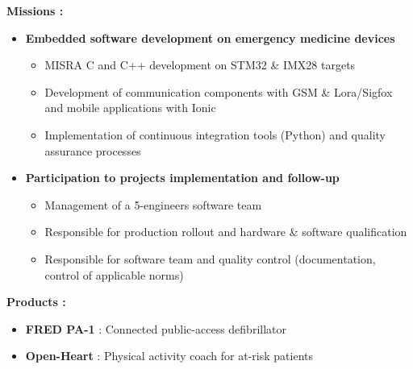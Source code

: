 {	%
\else
	\textcolor{color1}{\textbf{Missions :}}
	\begin{itemize}[leftmargin=\ListItemsMargins]
		\item \textbf{Embedded software development on emergency medicine devices}
		\begin{itemize}
			\item MISRA C and C++ development on STM32 \& IMX28 targets
			\item Development of communication components with GSM \& Lora/Sigfox and mobile applications with Ionic
			\item Implementation of continuous integration tools (Python) and quality assurance processes
		\end{itemize}
		\item \textbf{Participation to projects implementation and follow-up}
		\begin{itemize}
			\ifaddmngt \item Management of a 5-engineers software team \fi
			\item Responsible for production rollout and hardware \& software qualification
			\item Responsible for software team and quality control (documentation, control of applicable norms)
		\end{itemize}
	\end{itemize}
	\textcolor{color1}{\textbf{Products :}}
	\begin{itemize}[leftmargin=\ListItemsMargins]
		\item \textbf{FRED PA-1} : Connected public-access defibrillator \textcolor{color1}{\href{http://www.schiller.ch/corp/en/product/fred-pa-1}{\ExternalLink}}
		\item \textbf{Open-Heart} : Physical activity coach for at-risk patients \textcolor{color1}{\href{http://www.schiller.ch/corp/en/schiller-cutting-edge-connected-health}{\ExternalLink}}
	\end{itemize}
\fi
}



\vspace{\ItemsMaxSpacing}

